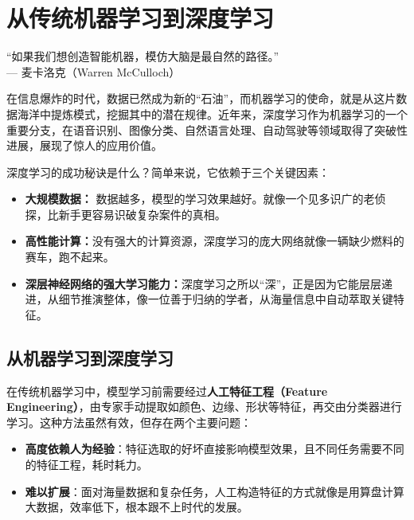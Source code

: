 
\chapter{从传统机器学习到深度学习}


\begin{flushright}
“如果我们想创造智能机器，模仿大脑是最自然的路径。” \\
--- 麦卡洛克（Warren McCulloch）
\end{flushright}

在信息爆炸的时代，数据已然成为新的“石油”，而机器学习的使命，就是从这片数据海洋中提炼模式，挖掘其中的潜在规律。近年来，深度学习作为机器学习的一个重要分支，在语音识别、图像分类、自然语言处理、自动驾驶等领域取得了突破性进展，展现了惊人的应用价值。

深度学习的成功秘诀是什么？简单来说，它依赖于三个关键因素：
\begin{itemize}
\item  {\bf 大规模数据：} 数据越多，模型的学习效果越好。就像一个见多识广的老侦探，比新手更容易识破复杂案件的真相。
\item {\bf 高性能计算：}没有强大的计算资源，深度学习的庞大网络就像一辆缺少燃料的赛车，跑不起来。
\item {\bf 深层神经网络的强大学习能力：}深度学习之所以“深”，正是因为它能层层递进，从细节推演整体，像一位善于归纳的学者，从海量信息中自动萃取关键特征。
\end{itemize}

\section{从机器学习到深度学习}
在传统机器学习中，模型学习前需要经过{\bf 人工特征工程（Feature Engineering）}，由专家手动提取如颜色、边缘、形状等特征，再交由分类器进行学习。这种方法虽然有效，但存在两个主要问题：
\begin{itemize}
    \item \textbf{高度依赖人为经验}：特征选取的好坏直接影响模型效果，且不同任务需要不同的特征工程，耗时耗力。
    \item \textbf{难以扩展}：面对海量数据和复杂任务，人工构造特征的方式就像是用算盘计算大数据，效率低下，根本跟不上时代的发展。
\end{itemize}

